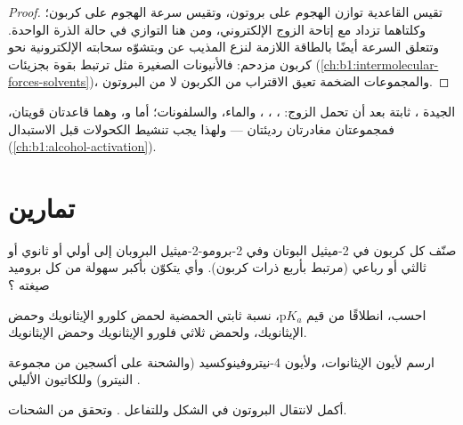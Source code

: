 \begin{proof}
تقيس القاعدية توازن الهجوم على بروتون،
وتقيس  سرعة الهجوم على كربون؛ وكلتاهما تزداد مع
إتاحة الزوج الإلكتروني، ومن هنا التوازي في حالة الذرة الواحدة.
وتتعلق السرعة أيضًا بالطاقة اللازمة لنزع المذيب عن
 وبتشوّه سحابته الإلكترونية نحو
كربون مزدحم: فالأنيونات الصغيرة مثل  ترتبط بقوة بجزيئات  (\cref{ch:b1:intermolecular-forces-solvents})،
والمجموعات الضخمة تعيق الاقتراب من الكربون لا من البروتون.
\end{proof}

 الجيدة ، ثابتة بعد أن تحمل الزوج:
، ، ، والماء، والسلفونات؛ أما  و، وهما قاعدتان
قويتان، فمجموعتان مغادرتان رديئتان --- ولهذا يجب
تنشيط الكحولات قبل الاستبدال (\cref{ch:b1:alcohol-activation}).

\section{تمارين}

\begin{exercise}[$\star$]\label{exo:b1:electronic-effects:1}
صنّف كل كربون في 2-ميثيل البوتان وفي 2-برومو-2-ميثيل البروبان إلى
أولي أو ثانوي أو ثالثي أو رباعي (مرتبط بأربع ذرات كربون). وأي
 يتكوّن بأكبر سهولة من كل بروميد صيغته ؟
\end{exercise}

\begin{exercise}[$\star$]\label{exo:b1:electronic-effects:2}
احسب، انطلاقًا من قيم $\mathrm{p}K_a$، نسبة ثابتي
الحمضية لحمض كلورو الإيثانويك وحمض الإيثانويك، ولحمض ثلاثي فلورو الإيثانويك
وحمض الإيثانويك.
\end{exercise}

\begin{exercise}[$\star$]\label{exo:b1:electronic-effects:3}
ارسم  لأيون الإيثانوات، ولأيون 4-نيتروفينوكسيد
(والشحنة على أكسجين من مجموعة النيترو) وللكاتيون
الأليلي .
\end{exercise}

\begin{exercise}[$\star$]\label{exo:b1:electronic-effects:4}
أكمل  لانتقال البروتون في الشكل وللتفاعل
. وتحقق من الشحنات.
\end{exercise}

